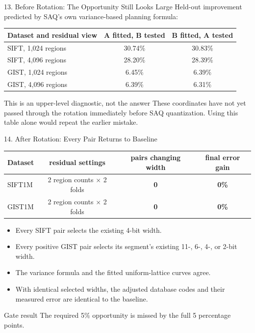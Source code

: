 \documentclass[aspectratio=169]{beamer}
\newcommand{\bad}[1]{\textcolor{red!75!black}{\textbf{#1}}}
\begin{document}
\begin{frame}{13. Before Rotation: The Opportunity Still Looks Large}
\small
Held-out improvement predicted by SAQ's own variance-based planning formula:
\begin{center}
\begin{tabular}{lcc}
\toprule
Dataset and residual view & A fitted, B tested & B fitted, A tested\\
\midrule
SIFT, 1,024 regions & 30.74\% & 30.83\%\\
SIFT, 4,096 regions & 28.20\% & 28.39\%\\
GIST, 1,024 regions & 6.45\% & 6.39\%\\
GIST, 4,096 regions & 6.39\% & 6.31\%\\
\bottomrule
\end{tabular}
\end{center}
\begin{alertblock}{This is an upper-level diagnostic, not the answer}
These coordinates have not yet passed through the rotation immediately before
SAQ quantization. Using this table alone would repeat the earlier mistake.
\end{alertblock}
\end{frame}

\begin{frame}{14. After Rotation: Every Pair Returns to Baseline}
\small
\begin{center}
\begin{tabular}{lccc}
\toprule
Dataset & residual settings & pairs changing width & final error gain\\
\midrule
SIFT1M & 2 region counts $\times$ 2 folds & \bad{0} & \bad{0\%}\\
GIST1M & 2 region counts $\times$ 2 folds & \bad{0} & \bad{0\%}\\
\bottomrule
\end{tabular}
\end{center}
\begin{itemize}
  \item Every SIFT pair selects the existing 4-bit width.
  \item Every positive GIST pair selects its segment's existing 11-, 6-, 4-,
  or 2-bit width.
  \item The variance formula and the fitted uniform-lattice curves agree.
  \item With identical selected widths, the adjusted database codes and their
  measured error are identical to the baseline.
\end{itemize}
\begin{alertblock}{Gate result}
The required 5\% opportunity is missed by the full 5 percentage points.
\end{alertblock}
\end{frame}
\end{document}
